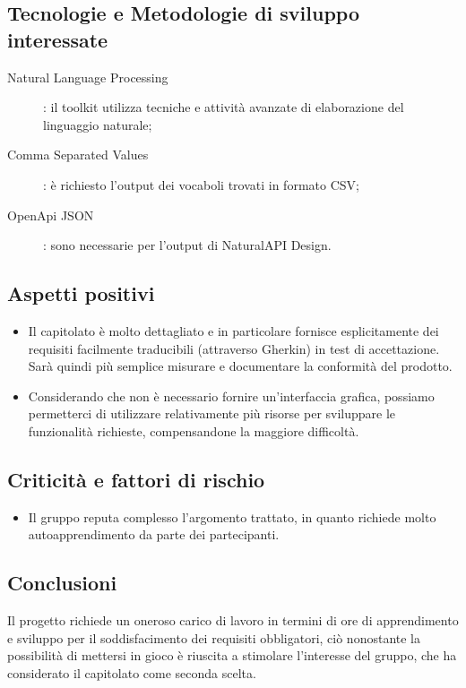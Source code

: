 \documentclass[../studio-di-fattibilita.tex]{subfiles}
\begin{document}
  \subsection{Tecnologie e Metodologie di sviluppo interessate}
  \label{subsec:tecnologie_interessate}
  \begin{description}
		\item[Natural Language Processing]: il toolkit utilizza tecniche e attività avanzate di elaborazione del linguaggio naturale;
		\item[Comma Separated Values]: è richiesto l'output dei vocaboli trovati in formato CSV;
		\item[OpenApi JSON]: sono necessarie per l'output di NaturalAPI Design.
  \end{description}


  \subsection{Aspetti positivi}
  \label{subsec:aspetti_positivi}
  \begin{itemize}
    \item Il capitolato è molto dettagliato e in particolare fornisce esplicitamente dei requisiti facilmente traducibili (attraverso Gherkin) in test di accettazione. Sarà quindi più semplice misurare e documentare la conformità del prodotto.
    \item Considerando che non è necessario fornire un'interfaccia grafica, possiamo permetterci di utilizzare relativamente più risorse per sviluppare le funzionalità richieste, compensandone la maggiore difficoltà.
  \end{itemize}


  \subsection{Criticità e fattori di rischio}
	\label{subsec:criticita_e_fattori_di_rischio}
	\begin{itemize}
		\item Il gruppo reputa complesso l'argomento trattato, in quanto richiede molto autoapprendimento da parte dei partecipanti.
	\end{itemize}
  

	\subsection{Conclusioni}
	\label{subsec:conclusioni}
  Il progetto richiede un oneroso carico di lavoro in termini di ore di apprendimento e sviluppo per il soddisfacimento dei requisiti obbligatori, ciò nonostante la possibilità di mettersi in gioco è riuscita a stimolare l'interesse del gruppo, che ha considerato il capitolato come seconda scelta.
  
\end{document}
